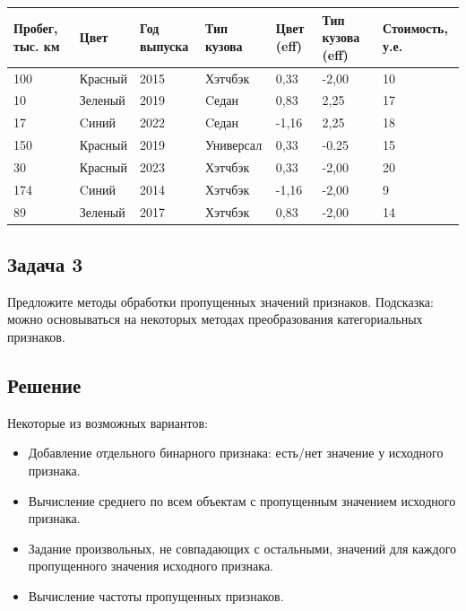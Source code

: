 \begin{table}[ht]
	\footnotesize
	\begin{tabular}{lllllll}
		\hline
		Пробег, тыс. км & Цвет    & Год выпуска & Тип кузова & Цвет (eff) & Тип кузова (eff) & Стоимость, у.е. \\ \hline
		100             & Красный & 2015        & Хэтчбэк    & 0,33        & -2,00           & 10           \\
		10              & Зеленый & 2019        & Cедан      & 0,83        & 2,25            & 17           \\
		17              & Cиний   & 2022        & Cедан      & -1,16      & 2,25             & 18           \\
		150             & Красный & 2019        & Универсал  & 0,33        & -0.25             & 15           \\
		30              & Красный & 2023        & Хэтчбэк    & 0,33        & -2,00            & 20           \\
		174             & Cиний   & 2014        & Хэтчбэк    & -1,16      & -2,00            & 9            \\
		89              & Зеленый & 2017        & Хэтчбэк    & 0,83        & -2,00            & 14           \\ \hline
	\end{tabular}
\end{table}

\subsection*{Задача 3}

Предложите методы обработки пропущенных значений признаков.
Подсказка: можно основываться на некоторых методах преобразования категориальных признаков.

\subsection*{Решение}

Некоторые из возможных вариантов:
\begin{itemize}
	\item Добавление отдельного бинарного признака: есть/нет значение у исходного признака.
	\item Вычисление среднего по всем объектам с пропущенным значением исходного признака.
	\item Задание произвольных, не совпадающих с остальными, значений для каждого пропущенного значения исходного признака.
	\item Вычисление частоты пропущенных признаков.
\end{itemize}
